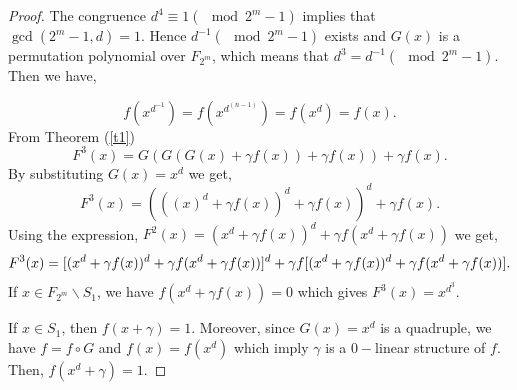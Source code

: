 \documentclass[12pt,a4paper]{article}
\begin{document}
\begin{proof}
	The congruence	$ d^{4}\equiv1(\mod2^{m}-1) $ implies that $ \gcd(2^{m}-1,d)=1 $. Hence $ d^{-1}(\mod  2^{m}-1 ) $ exists  and $ G(x) $ is a permutation polynomial over $ F_{2^{m}} $, which means that $ d^{3}=d^{-1}(\mod2^{m}-1) $. Then we have,
	
	\begin{equation}
		f(x^{d^{-1}})=f(x^{d^{(n-1)}})=f(x^{d})=f(x).
	\end{equation}
	From Theorem (\ref{t1})
	\begin{equation}
		F^{3}(x)=G(G(G(x)+\gamma f(x))+\gamma f(x))+\gamma f(x).
	\end{equation}
	By substituting $ G(x)=x^{d} $ we get,
	\begin{equation}
		F^{3}(x)=(((x)^{d}+\gamma f(x))^{d}+\gamma f(x))^{d}+\gamma f(x).
	\end{equation}
	Using the expression, $ F^{2}(x)=(x^{d}+\gamma f(x))^{d}+\gamma f(x^{d}+\gamma f(x)) $ we get,
	\begin{equation}
		F^{3}(x)=[(x^{d}+\gamma f(x))^{d}+\gamma f(x^{d}+\gamma f(x))]^{d}+\gamma f[(x^{d}+\gamma f(x))^{d}+\gamma f(x^{d}+\gamma f(x))].\\
	\end{equation}
	If $ x\in F_{2^{m}}\backslash S_{1} $, we have $ f(x^{d}+\gamma f(x))=0 $ which gives $ F^{3}(x)=x^{d^{3}} $.
	
	If $ x\in S_{1} $, then $ f(x+\gamma)=1 $. Moreover, since $ G(x)=x^{d} $ is a quadruple, we have $ f=f\circ G $ and $ f(x)=f(x^{d}) $ which imply $ \gamma $ is a $0-$linear structure of $ f $. Then, $ f(x^{d}+\gamma)=1 $.
	

\end{proof}
\end{document}
